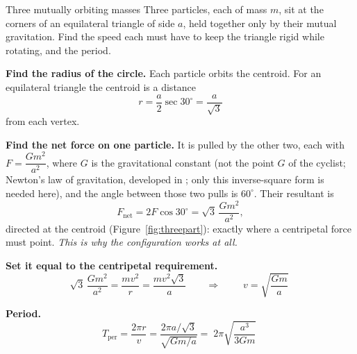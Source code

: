 \begin{exbox}{Three mutually orbiting masses}
Three particles, each of mass $m$, sit at the corners of an equilateral triangle of side $a$, held
together only by their mutual gravitation. Find the speed each must have to keep the triangle rigid
while rotating, and the period.

 \textbf{Find the radius of the circle.} Each particle orbits the centroid. For an equilateral
triangle the centroid is a distance
\[
r=\frac{a}{2}\sec30^\circ=\frac{a}{\sqrt3}
\]
from each vertex.

 \textbf{Find the net force on one particle.} It is pulled by the other two, each with
$F=\dfrac{Gm^{2}}{a^{2}}$, where $G$ is the gravitational constant (not the point $G$ of the cyclist; Newton's law of gravitation, developed in ; only this
inverse-square form is needed here), and the angle between those two pulls is $60^\circ$. Their resultant is
\[
F_{\text{net}}=2F\cos30^\circ=\sqrt3\,\frac{Gm^{2}}{a^{2}},
\]
directed at the centroid (Figure~\ref{fig:threepart}): exactly where a centripetal force must point. \emph{This is why the
configuration works at all.}

 \textbf{Set it equal to the centripetal requirement.}
\[
\sqrt3\,\frac{Gm^{2}}{a^{2}}=\frac{mv^{2}}{r}=\frac{mv^{2}\sqrt3}{a}
\qquad\Longrightarrow\qquad
\boxed{\;v=\sqrt{\frac{Gm}{a}}\;}
\]

 \textbf{Period.}
\[
T_{\text{per}}=\frac{2\pi r}{v}=\frac{2\pi a/\sqrt3}{\sqrt{Gm/a}}
=\boxed{\;2\pi\sqrt{\frac{a^{3}}{3Gm}}\;}
\]
\end{exbox}

\begin{figure}[htbp]
\centering
{}
\end{figure}

